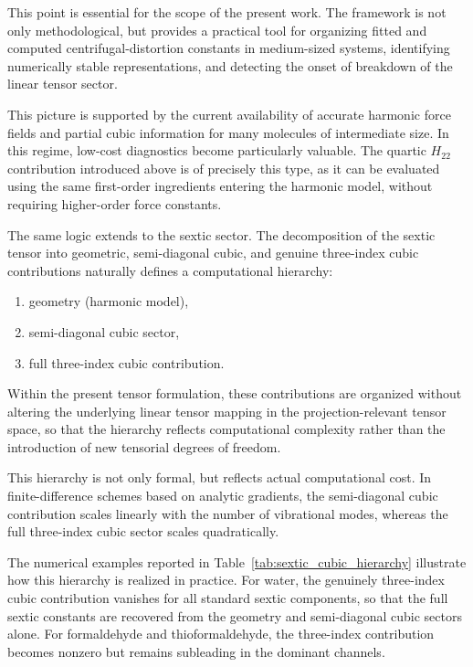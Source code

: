 \documentclass[aip,jcp,reprint,floatfix]{revtex4-2}
\begin{document}
This point is essential for the scope of the present work. The
framework is not only methodological, but provides a practical tool
for organizing fitted and computed centrifugal-distortion constants
in medium-sized systems, identifying numerically stable
representations, and detecting the onset of breakdown of the linear
tensor sector.

This picture is supported by the current availability of accurate
harmonic force fields and partial cubic information for many molecules
of intermediate size. In this regime, low-cost diagnostics become
particularly valuable. The quartic $H_{22}$ contribution introduced
above is of precisely this type, as it can be evaluated using the same
first-order ingredients entering the harmonic model, without requiring
higher-order force constants.

The same logic extends to the sextic sector. The decomposition of the
sextic tensor into geometric, semi-diagonal cubic, and genuine
three-index cubic contributions naturally defines a computational
hierarchy:
\begin{enumerate}
\item geometry (harmonic model),
\item semi-diagonal cubic sector,
\item full three-index cubic contribution.
\end{enumerate}

Within the present tensor formulation, these contributions are
organized without altering the underlying linear tensor mapping in the
projection-relevant tensor space, so that the hierarchy reflects
computational complexity rather than the introduction of new tensorial
degrees of freedom.

This hierarchy is not only formal, but reflects actual computational
cost. In finite-difference schemes based on analytic gradients, the
semi-diagonal cubic contribution scales linearly with the number of
vibrational modes, whereas the full three-index cubic sector scales
quadratically.\cite{cubic-vib_2024,pccp_2025}

The numerical examples reported in
Table~\ref{tab:sextic_cubic_hierarchy} illustrate how this hierarchy
is realized in practice. For water, the genuinely three-index cubic
contribution vanishes for all standard sextic components, so that the
full sextic constants are recovered from the geometry and
semi-diagonal cubic sectors alone. For formaldehyde and
thioformaldehyde, the three-index contribution becomes nonzero but
remains subleading in the dominant channels.
\end{document}
